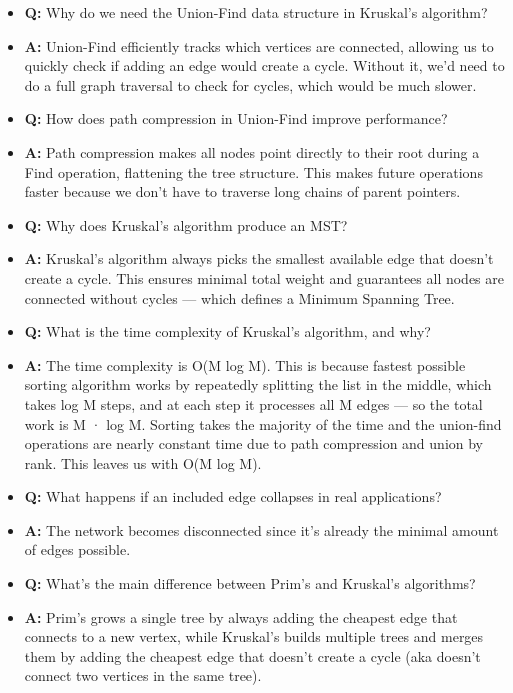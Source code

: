 \documentclass[11pt,a4paper]{article}
\begin{document}
\begin{multicols}{2}
\begin{itemize}
    \item \textbf{Q:} Why do we need the Union-Find data structure in Kruskal's algorithm?
    \item \textbf{A:} Union-Find efficiently tracks which vertices are connected, allowing us to quickly check if adding an edge would create a cycle. Without it, we'd need to do a full graph traversal to check for cycles, which would be much slower.

    \item \textbf{Q:} How does path compression in Union-Find improve performance?
    \item \textbf{A:} Path compression makes all nodes point directly to their root during a Find operation, flattening the tree structure. This makes future operations faster because we don't have to traverse long chains of parent pointers.

    \item \textbf{Q:} Why does Kruskal's algorithm produce an MST?
    \item \textbf{A:} Kruskal's algorithm always picks the smallest available edge that doesn't create a cycle. This ensures minimal total weight and guarantees all nodes are connected without cycles — which defines a Minimum Spanning Tree.

    \item \textbf{Q:} What is the time complexity of Kruskal's algorithm, and why?
    \item \textbf{A:} The time complexity is O(M log M). This is because fastest possible sorting algorithm works by repeatedly splitting the list in the middle, which takes log M steps, and at each step it processes all M edges — so the total work is M · log M. Sorting takes the majority of the time and the union-find operations are nearly constant time due to path compression and union by rank. This leaves us with O(M log M).

    \item \textbf{Q:} What happens if an included edge collapses in real applications?
    \item \textbf{A:} The network becomes disconnected since it's already the minimal amount of edges possible.

    \item \textbf{Q:} What's the main difference between Prim's and Kruskal's algorithms?
    \item \textbf{A:} Prim's grows a single tree by always adding the cheapest edge that connects to a new vertex, while Kruskal's builds multiple trees and merges them by adding the cheapest edge that doesn't create a cycle (aka doesn't connect two vertices in the same tree).


\end{itemize}
\end{multicols}
\end{document}
